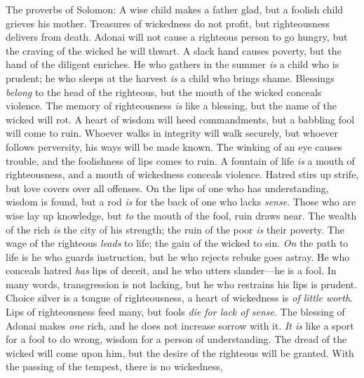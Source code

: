 \begin{biblechapter} %
 The proverbs of Solomon: 
A wise child makes a father glad, 
but a foolish child grieves his mother.
\verse Treasures of wickedness do not profit, 
but righteousness delivers from death.
\verse Adonai will not cause a righteous person to go hungry, 
but the craving of the wicked he will thwart.
\verse A slack hand causes poverty, 
but the hand of the diligent enriches.
\verse He who gathers in the summer \textit{is} a child who is prudent; 
he who sleeps at the harvest \textit{is} a child who brings shame.
\verse Blessings \textit{belong} to the head of the righteous, 
but the mouth of the wicked conceals violence.
\verse The memory of righteousness \textit{is} like a blessing, 
but the name of the wicked will rot.
\verse A heart of wisdom will heed commandments, 
but a babbling fool will come to ruin.
\verse Whoever walks in integrity will walk securely, 
but whoever follows perversity, his ways will be made known.
\verse The winking of an eye causes trouble, 
and the foolishness of lips comes to ruin.
\verse A fountain of life \textit{is} a mouth of righteousness, 
and a mouth of wickedness conceals violence.
\verse Hatred stirs up strife, 
but love covers over all offenses.
\verse On the lips of one who has understanding, wisdom is found, 
but a rod \textit{is} for the back of one who lacks \textit{sense}.
\verse Those who are wise lay up knowledge, 
but \textit{to} the mouth of the fool, ruin draws near.
\verse The wealth of the rich \textit{is} the city of his strength; 
the ruin of the poor \textit{is} their poverty.
\verse The wage of the righteous \textit{leads} to life; 
the gain of the wicked to sin.
\verse \textit{On} the path to life is he who guards instruction, 
but he who rejects rebuke goes astray.
\verse He who conceals hatred \textit{has} lips of deceit, 
and he who utters slander—he is a fool.
\verse In many words, transgression is not lacking, 
but he who restrains his lips is prudent.
\verse Choice silver is a tongue of righteousness, 
a heart of wickedness is \textit{of little worth}.
\verse Lips of righteousness feed many, 
but fools \textit{die for lack of sense}.
\verse The blessing of Adonai makes \textit{one} rich, 
and he does not increase sorrow with it.
\verse \textit{It is} like a sport for a fool to do wrong, 
wisdom for a person of understanding.
\verse The dread of the wicked will come upon him, 
but the desire of the righteous will be granted.
\verse With the passing of the tempest, there is no wickedness, 

\end{biblechapter}
